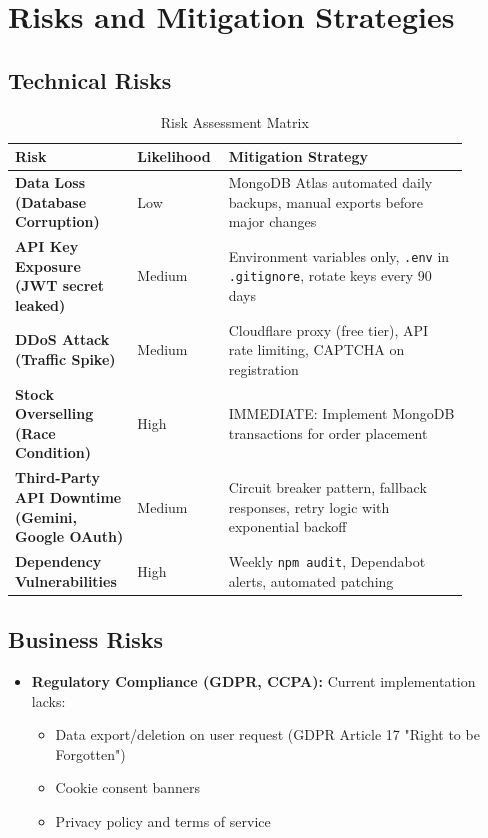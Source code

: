 \documentclass[12pt, a4paper]{report}
\begin{document}
{{\section{Risks and Mitigation Strategies}

\subsection{Technical Risks}

\begin{table}[H]
\centering
\caption{Risk Assessment Matrix}
\label{tab:risk_matrix}
\small
\begin{tabular}{@{}p{0.25\linewidth}p{0.15\linewidth}p{0.50\linewidth}@{}}
\toprule
\textbf{Risk} & \textbf{Likelihood} & \textbf{Mitigation Strategy} \\
\midrule
\textbf{Data Loss (Database Corruption)} & Low & MongoDB Atlas automated daily backups, manual exports before major changes \\
\textbf{API Key Exposure (JWT secret leaked)} & Medium & Environment variables only, \texttt{.env} in \texttt{.gitignore}, rotate keys every 90 days \\
\textbf{DDoS Attack (Traffic Spike)} & Medium & Cloudflare proxy (free tier), API rate limiting, CAPTCHA on registration \\
\textbf{Stock Overselling (Race Condition)} & High & IMMEDIATE: Implement MongoDB transactions for order placement \\
\textbf{Third-Party API Downtime (Gemini, Google OAuth)} & Medium & Circuit breaker pattern, fallback responses, retry logic with exponential backoff \\
\textbf{Dependency Vulnerabilities} & High & Weekly \texttt{npm audit}, Dependabot alerts, automated patching \\
\bottomrule
\end{tabular}
\end{table}

\subsection{Business Risks}

\begin{itemize}
    \item \textbf{Regulatory Compliance (GDPR, CCPA):} Current implementation lacks:
    \begin{itemize}
        \item Data export/deletion on user request (GDPR Article 17 "Right to be Forgotten")
        \item Cookie consent banners
        \item Privacy policy and terms of service
    \end{itemize}
    

\end{itemize}}}
\end{document}
